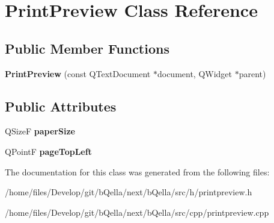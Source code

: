\hypertarget{classPrintPreview}{
\section{PrintPreview Class Reference}
\label{classPrintPreview}
}
\subsection*{Public Member Functions}
\begin{DoxyCompactItemize}
\item 
\hypertarget{classPrintPreview_a63a9c66336e4b066d7a85867f48bdf19}{
{\bfseries PrintPreview} (const QTextDocument $\ast$document, QWidget $\ast$parent)}
\label{classPrintPreview_a63a9c66336e4b066d7a85867f48bdf19}

\end{DoxyCompactItemize}
\subsection*{Public Attributes}
\begin{DoxyCompactItemize}
\item 
\hypertarget{classPrintPreview_a160ec92526a665f837f698a9abd77572}{
QSizeF {\bfseries paperSize}}
\label{classPrintPreview_a160ec92526a665f837f698a9abd77572}

\item 
\hypertarget{classPrintPreview_a5775ddfa965671607c4cc6d0c14c05b6}{
QPointF {\bfseries pageTopLeft}}
\label{classPrintPreview_a5775ddfa965671607c4cc6d0c14c05b6}

\end{DoxyCompactItemize}


The documentation for this class was generated from the following files:\begin{DoxyCompactItemize}
\item 
/home/files/Develop/git/bQella/next/bQella/src/h/printpreview.h\item 
/home/files/Develop/git/bQella/next/bQella/src/cpp/printpreview.cpp\end{DoxyCompactItemize}
